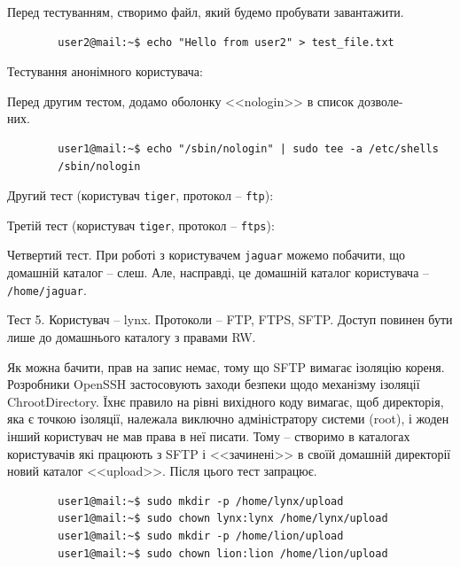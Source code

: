 \documentclass[14pt, a4paper]{extreport}
\begin{document}
	Перед тестуванням, створимо файл, який будемо пробувати завантажити.
	
	\begin{verbatim}
		user2@mail:~$ echo "Hello from user2" > test_file.txt
	\end{verbatim}
	
	Тестування анонімного користувача:
	
	
	Перед другим тестом, додамо оболонку <<nologin>> в список дозволе- \sideat{[VM 1]} \\ них.
	
	\begin{verbatim}
		user1@mail:~$ echo "/sbin/nologin" | sudo tee -a /etc/shells
		/sbin/nologin
	\end{verbatim}
	
	Другий тест (користувач \texttt{tiger}, протокол -- \texttt{ftp}):
	
	
	Третій тест (користувач \texttt{tiger}, протокол -- \texttt{ftps}):
	
	
	Четвертий тест. При роботі з користувачем \texttt{jaguar} можемо побачити, що домашній каталог -- слеш. Але, насправді, це домашній каталог користувача -- \texttt{/home/jaguar}. 
	
	
	Тест 5. Користувач -- lynx. Протоколи -- FTP, FTPS, SFTP. Доступ повинен бути лише до домашнього каталогу з правами RW. 
	
	
	Як можна бачити, прав на запис немає, тому що SFTP вимагає ізоляцію кореня. Розробники OpenSSH застосовують заходи безпеки щодо механізму ізоляції ChrootDirectory. Їхнє правило на рівні вихідного коду вимагає, щоб директорія, яка є точкою ізоляції, належала виключно адміністратору системи (root), і жоден інший користувач не мав права в неї писати. Тому -- створимо в каталогах користувачів які працюють з SFTP і <<зачинені>> в своїй домашній директорії новий каталог <<upload>>. Після цього тест запрацює. \sideat{[VM 1]}
	
	\begin{verbatim}
		user1@mail:~$ sudo mkdir -p /home/lynx/upload
		user1@mail:~$ sudo chown lynx:lynx /home/lynx/upload
		user1@mail:~$ sudo mkdir -p /home/lion/upload
		user1@mail:~$ sudo chown lion:lion /home/lion/upload
	\end{verbatim}
	
\end{document}
